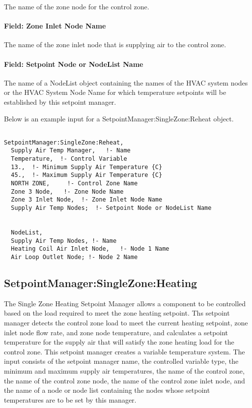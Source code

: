 The name of the zone node for the control zone.

\paragraph{Field: Zone Inlet Node Name}\label{field-zone-inlet-node-name}

The name of the zone inlet node that is supplying air to the control zone.

\paragraph{Field: Setpoint Node or NodeList Name}\label{field-setpoint-node-or-nodelist-name-3}

The name of a NodeList object containing the names of the HVAC system nodes or the HVAC System Node Name for which temperature setpoints will be established by this setpoint manager.

Below is an example input for a SetpointManager:SingleZone:Reheat object.

\begin{lstlisting}

SetpointManager:SingleZone:Reheat,
  Supply Air Temp Manager,   !- Name
  Temperature,  !- Control Variable
  13.,  !- Minimum Supply Air Temperature {C}
  45.,  !- Maximum Supply Air Temperature {C}
  NORTH ZONE,     !- Control Zone Name
  Zone 3 Node,   !- Zone Node Name
  Zone 3 Inlet Node,  !- Zone Inlet Node Name
  Supply Air Temp Nodes;  !- Setpoint Node or NodeList Name


  NodeList,
  Supply Air Temp Nodes, !- Name
  Heating Coil Air Inlet Node,   !- Node 1 Name
  Air Loop Outlet Node; !- Node 2 Name
\end{lstlisting}

\subsection{SetpointManager:SingleZone:Heating}\label{setpointmanagersinglezoneheating}

The Single Zone Heating Setpoint Manager allows a component to be controlled based on the load required to meet the zone heating setpoint. Ths setpoint manager detects the control zone load to meet the current heating setpoint, zone inlet node flow rate, and zone node temperature, and calculates a setpoint temperature for the supply air that will satisfy the zone heating load for the control zone. This setpoint manager creates a variable temperature system. The input consists of the setpoint manager name, the controlled variable type, the minimum and maximum supply air temperatures, the name of the control zone, the name of the control zone node, the name of the control zone inlet node, and the name of a node or node list containing the nodes whose setpoint temperatures are to be set by this manager.

